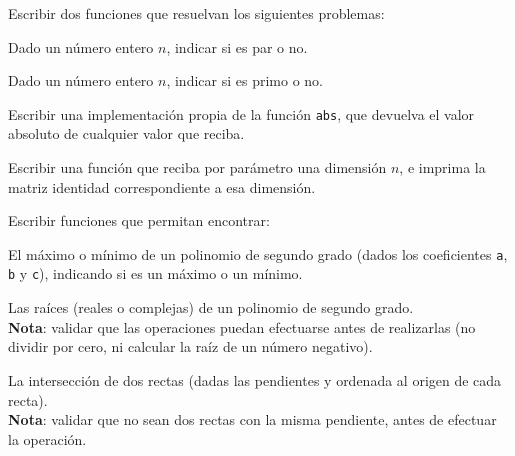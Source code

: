 \begin{ejercicio} Escribir dos funciones que resuelvan los siguientes problemas:
\begin{partes}
    \item Dado un número entero $n$, indicar si es par o no.
    \item Dado un número entero $n$, indicar si es primo o no.
\end{partes}
\end{ejercicio}

\begin{ejercicio}
Escribir una implementación propia de la función \verb!abs!, que devuelva
el valor absoluto de cualquier valor que reciba.
\end{ejercicio}

\begin{ejercicio}
Escribir una función que reciba por parámetro una dimensión $n$, e imprima
la matriz identidad correspondiente a esa dimensión.
\end{ejercicio}

\begin{ejercicio}
Escribir funciones que permitan encontrar:
\begin{partes}

    \item  El máximo o mínimo de un polinomio de segundo grado (dados los
coeficientes \verb!a!, \verb!b! y \verb!c!), indicando si es un máximo o un
mínimo.

    \item Las raíces (reales o complejas) de un polinomio de segundo grado. \\
{\bf Nota}: validar que las operaciones puedan efectuarse antes de
realizarlas (no dividir por cero, ni calcular la raíz de un número negativo).

    \item La intersección de dos rectas (dadas las pendientes y ordenada
 al origen de cada recta). \\
{\bf Nota}: validar que no sean dos rectas con la misma pendiente, antes de
efectuar la operación.
\end{partes}
\end{ejercicio}


